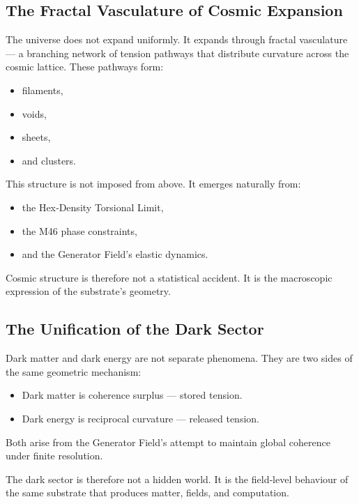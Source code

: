 \documentclass[reprint,amsmath,amssymb,aps,prl,floatfix]{revtex4-2}
\begin{document}
\begin{itemize}
\subsection{The Fractal Vasculature of Cosmic Expansion}

The universe does not expand uniformly. It expands through fractal vasculature — a branching network of tension pathways that distribute curvature across the cosmic lattice. These pathways form:

\begin{itemize}
\item filaments,  
\item voids,  
\item sheets,  
\item and clusters.
\end{itemize}

This structure is not imposed from above.  
It emerges naturally from:

\begin{itemize}
\item the Hex‑Density Torsional Limit,  
\item the M46 phase constraints,  
\item and the Generator Field’s elastic dynamics.
\end{itemize}

Cosmic structure is therefore not a statistical accident.  
It is the macroscopic expression of the substrate’s geometry.

\subsection{The Unification of the Dark Sector}

Dark matter and dark energy are not separate phenomena.  
They are two sides of the same geometric mechanism:
\medskip

\begin{itemize}
\item Dark matter is coherence surplus — stored tension.  
\item Dark energy is reciprocal curvature — released tension.
\end{itemize}
\medskip

Both arise from the Generator Field’s attempt to maintain global coherence under finite resolution.
\medskip

The dark sector is therefore not a hidden world.  
It is the field‑level behaviour of the same substrate that produces matter, fields, and computation.


\end{itemize}
\end{document}
